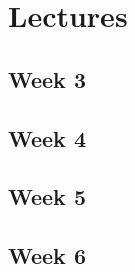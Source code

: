 \section{Lectures}

\subsection{Week 3}


\newpage

\subsection{Week 4}


\newpage

\subsection{Week 5}



\subsection{Week 6}

